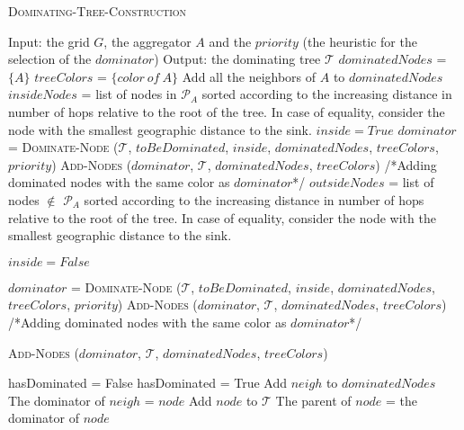 \begin{algorithm}\caption{\textsc{Dominating-Tree-Construction}}\label{algo:domTree}
\begin{algorithmic}[1]
\begin{scriptsize}
\STATE Input: the grid $G$, the aggregator $A$ and the $priority$ (the heuristic for the selection of the $dominator$)
\STATE Output: the dominating tree $\mathcal{T}$  
\STATE $dominatedNodes$ = $\{A\}$
\STATE $treeColors$ = $\{color~of~A\}$ \STATE Add all the neighbors of $A$ to $dominatedNodes$
\STATE $insideNodes$ = list of nodes in $\mathcal{P}_{A}$ sorted according to the increasing distance in number of hops relative to the root of the tree. In case of equality, consider the node with the smallest geographic distance to the sink.
\STATE $inside=True$
	\STATE $dominator$ = \textsc{Dominate-Node} ($\mathcal{T}$, $toBeDominated$, $inside$,  $dominatedNodes$, $treeColors$, $priority$)
	\STATE \textsc{Add-Nodes} ($dominator$, $\mathcal{T}$, $dominatedNodes$, $treeColors$) /*Adding dominated nodes with the same color as $dominator$*/
	\ENDIF
\ENDFOR
\STATE $outsideNodes$ = list of nodes $\notin$ $\mathcal{P}_{A}$ sorted according to the increasing distance in number of hops relative to the root of the tree. In case of equality, consider the node with the smallest geographic distance to the sink.

\STATE $inside=False$ 

	\STATE $dominator$ = \textsc{Dominate-Node} ($\mathcal{T}$, $toBeDominated$, $inside$, $dominatedNodes$, $treeColors$, $priority$)
	\STATE \textsc{Add-Nodes} ($dominator$, $\mathcal{T}$, $dominatedNodes$, $treeColors$) /*Adding dominated nodes with the same color as $dominator$*/
	\ENDIF
\ENDFOR
\end{scriptsize}
\end{algorithmic}
\end{algorithm}
\vspace{-11pt}
\begin{algorithm}
\caption{\textsc{Add-Nodes} ($dominator$, $\mathcal{T}$, $dominatedNodes$, $treeColors$)}\label{algo:addNode}
\begin{algorithmic}[1]
\begin{scriptsize}
	\STATE hasDominated = False	
		\STATE hasDominated = True		
		\STATE Add $neigh$ to $dominatedNodes$ 		
		\STATE The dominator of $neigh$ = $node$ 		
		\ENDIF	
	\ENDFOR
	\ENDIF	
		\STATE Add $node$ to $\mathcal{T}$ \label{line:addT2}
		\STATE The parent of $node$ = the dominator of $node$
	\ENDIF	
\ENDFOR
\end{scriptsize}\end{algorithmic}
\end{algorithm}



